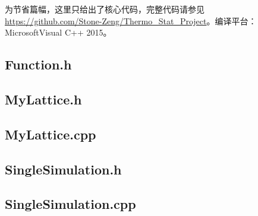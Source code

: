 \documentclass{article}
\begin{document}
		为节省篇幅，这里只给出了核心代码，完整代码请参见 \url{https://github.com/Stone-Zeng/Thermo_Stat_Project}。编译平台：Microsoft\textregistered\;Visual C++ 2015。
		\linespread{1}
%		
		\subsection{Function.h}
		
		\subsection{MyLattice.h}
		
		\subsection{MyLattice.cpp}
		
%		
%		
		\subsection{SingleSimulation.h}
		
		\subsection{SingleSimulation.cpp}
		
%		
%		
\end{document}
